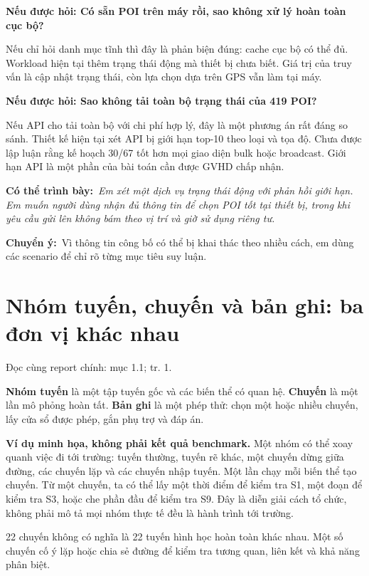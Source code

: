 \documentclass[10pt,a4paper]{article}
\newcommand{\say}[1]{\par\textbf{Có thể trình bày:}\ \textit{#1}\par}
\newcommand{\ask}[2]{\par\textbf{Nếu được hỏi: #1}\par #2\par}
\newcommand{\where}[1]{\par{\small\color{gray}Đọc cùng report chính: #1.}\par}
\newcommand{\transition}[1]{\par\textbf{Chuyển ý:}\ #1\par}
\newcommand{\example}{\textbf{Ví dụ minh họa, không phải kết quả benchmark.} }
\newcommand{\guidepage}[1]{\clearpage\section{#1}}
\begin{document}
\ask{Có sẵn POI trên máy rồi, sao không xử lý hoàn toàn cục bộ?}{Nếu chỉ hỏi danh mục tĩnh thì đây là phản biện đúng: cache cục bộ có thể đủ. Workload hiện tại thêm trạng thái động mà thiết bị chưa biết. Giá trị của truy vấn là cập nhật trạng thái, còn lựa chọn dựa trên GPS vẫn làm tại máy.}

\ask{Sao không tải toàn bộ trạng thái của 419 POI?}{Nếu API cho tải toàn bộ với chi phí hợp lý, đây là một phương án rất đáng so sánh. Thiết kế hiện tại xét API bị giới hạn top-10 theo loại và tọa độ. Chưa được lập luận rằng kế hoạch 30/67 tốt hơn mọi giao diện bulk hoặc broadcast. Giới hạn API là một phần của bài toán cần được GVHD chấp nhận.}

\say{Em xét một dịch vụ trạng thái động với phản hồi giới hạn. Em muốn người dùng nhận đủ thông tin để chọn POI tốt tại thiết bị, trong khi yêu cầu gửi lên không bám theo vị trí và giờ sử dụng riêng tư.}
\transition{Vì thông tin công bố có thể bị khai thác theo nhiều cách, em dùng các scenario để chỉ rõ từng mục tiêu suy luận.}

\guidepage{Nhóm tuyến, chuyến và bản ghi: ba đơn vị khác nhau}
\where{mục 1.1; tr. 1}
\textbf{Nhóm tuyến} là một tập tuyến gốc và các biến thể có quan hệ. \textbf{Chuyến} là một lần mô phỏng hoàn tất. \textbf{Bản ghi} là một phép thử: chọn một hoặc nhiều chuyến, lấy cửa sổ được phép, gắn phụ trợ và đáp án.

\example Một nhóm có thể xoay quanh việc đi tới trường: tuyến thường, tuyến rẽ khác, một chuyến dừng giữa đường, các chuyến lặp và các chuyến nhập tuyến. Một lần chạy mỗi biến thể tạo chuyến. Từ một chuyến, ta có thể lấy một thời điểm để kiểm tra S1, một đoạn để kiểm tra S3, hoặc che phần đầu để kiểm tra S9. Đây là diễn giải cách tổ chức, không phải mô tả mọi nhóm thực tế đều là hành trình tới trường.

\begin{center}
\end{center}
22 chuyến không có nghĩa là 22 tuyến hình học hoàn toàn khác nhau. Một số chuyến cố ý lặp hoặc chia sẻ đường để kiểm tra tương quan, liên kết và khả năng phân biệt.
\end{document}
